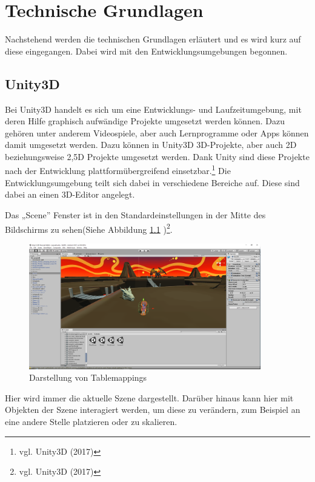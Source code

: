 \chapter{Technische Grundlagen}
	Nachstehend werden die technischen Grundlagen erläutert und es wird kurz auf diese eingegangen. Dabei wird mit den Entwicklungsumgebungen begonnen.

\section{Unity3D}
Bei Unity3D handelt es sich um eine Entwicklungs- und Laufzeitumgebung, mit deren Hilfe graphisch aufwändige Projekte umgesetzt werden können. Dazu gehören unter anderem Videospiele, aber auch Lernprogramme oder Apps können damit umgesetzt werden. Dazu können in Unity3D 3D-Projekte, aber auch 2D beziehungsweise 2,5D Projekte umgesetzt werden. Dank Unity sind diese Projekte nach der Entwicklung plattformübergreifend einsetzbar.\footnote{vgl. Unity3D \cite{unity1} (2017)} Die Entwicklungsumgebung teilt sich dabei in verschiedene Bereiche auf. Diese sind dabei an einen 3D-Editor angelegt.

Das „Scene” Fenster ist in den Standardeinstellungen in der Mitte des Bildschirms zu sehen(Siehe Abbildung \ref{scene} )\footnote{vgl. Unity3D \cite{unity2} (2017)}.

\begin{figure}[htbp]
\centering 
\label{scene}
\includegraphics[width=0.9\textwidth]{pics/unity3d_ui.png}
\caption{Darstellung von Tablemappings}
\end{figure}

Hier wird immer die aktuelle Szene dargestellt. Darüber hinaus kann hier mit Objekten der Szene interagiert werden, um diese zu verändern, zum Beispiel an eine andere Stelle platzieren oder zu skalieren.

